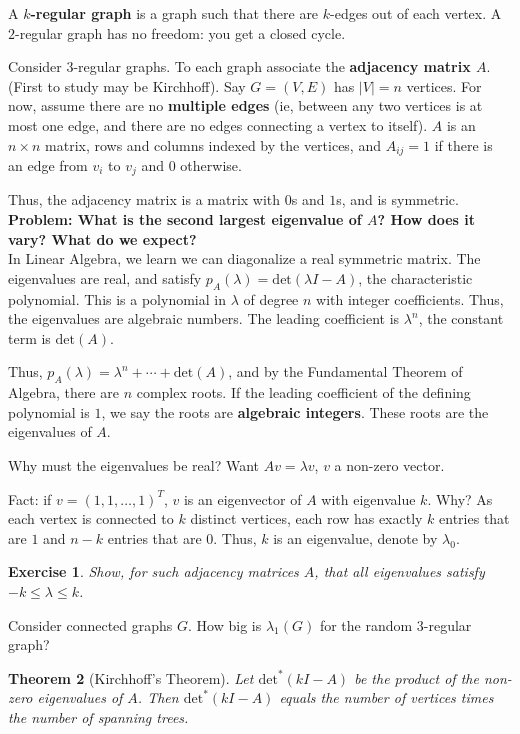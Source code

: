 \documentclass[12pt,letterpaper]{report}
\newtheorem{thm}{Theorem}[section]
\newtheorem{exe}[thm]{Exercise}
\begin{document}
A \textbf{$k$-regular graph} is a graph such that there are
$k$-edges out of each vertex. A $2$-regular graph has no freedom:
you get a closed cycle.

Consider $3$-regular graphs. To each graph associate the
\textbf{adjacency matrix $A$}. (First to study may be Kirchhoff).
Say $G = (V,E)$ has $|V| = n$ vertices. For now, assume there are
no \textbf{multiple edges} (ie, between any two vertices is at
most one edge, and there are no edges connecting a vertex to
itself). $A$ is an $n \times n$ matrix, rows and columns indexed
by the vertices, and $A_{ij} = 1$ if there is an edge from $v_i$
to $v_j$ and $0$ otherwise.

Thus, the adjacency matrix is a matrix with $0$s and $1$s, and is
symmetric. \\

\textbf{Problem: What is the second largest eigenvalue of $A$? How
does it vary? What do we expect?} \\

In Linear Algebra, we learn we can diagonalize a real symmetric
matrix. The eigenvalues are real, and satisfy $p_A(\lambda) =
\mbox{det}(\lambda I - A)$, the characteristic polynomial. This is
a polynomial in $\lambda$ of degree $n$ with integer coefficients.
Thus, the eigenvalues are algebraic numbers. The leading
coefficient is $\lambda^n$, the constant term is $\mbox{det}(A)$.

Thus, $p_A(\lambda) = \lambda^n + \cdots + \mbox{det}(A)$, and by
the Fundamental Theorem of Algebra, there are $n$ complex roots.
If the leading coefficient of the defining polynomial is $1$, we
say the roots are \textbf{algebraic integers}. These roots are the
eigenvalues of $A$.

Why must the eigenvalues be real? Want $Av = \lambda v$, $v$ a
non-zero vector.

Fact: if $v = (1,1,\dots,1)^T$, $v$ is an eigenvector of $A$ with
eigenvalue $k$. Why? As each vertex is connected to $k$ distinct
vertices, each row has exactly $k$ entries that are $1$ and $n-k$
entries that are $0$. Thus, $k$ is an eigenvalue, denote by
$\lambda_0$.

\begin{exe} Show, for such adjacency matrices $A$, that all
eigenvalues satisfy $-k \le \lambda \le k$. \end{exe}

Consider connected graphs $G$. How big is $\lambda_1(G)$ for the
random $3$-regular graph?

\begin{thm}[Kirchhoff's Theorem] Let $\mbox{det}^{*}(kI-A)$ be
the product of the non-zero eigenvalues of $A$. Then
$\mbox{det}^{*}(kI-A)$ equals the number of vertices times the
number of spanning trees. \end{thm}
\end{document}
